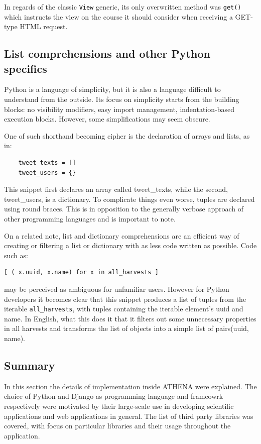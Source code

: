In regards of the classic \texttt{View} generic, its only overwritten method was \texttt{get()} which instructs the view on the course it should consider when receiving a GET-type HTML request.

\subsection{List comprehensions and other Python specifics}
\label{listcomprehensions}
Python is a language of simplicity, but it is also a language difficult to understand from the outside. Its focus on simplicity starts from the building blocks: no visibility modifiers, easy import management, indentation-based execution blocks. However, some simplifications may seem obscure.

One of such shorthand becoming cipher is the declaration of arrays and lists, as in:
\begin{lstlisting}
    tweet_texts = []
    tweet_users = {}
\end{lstlisting}

This snippet first declares an array called tweet\_texts, while the second, tweet\_users, is a dictionary. To complicate things even worse, tuples are declared using round braces. This is in opposition to the generally verbose approach of other programming languages and is important to note.

On a related note, list and dictionary comprehensions are an efficient way of creating or filtering a list or dictionary with as less code written as possible. Code such as:

\begin{lstlisting}
[ ( x.uuid, x.name) for x in all_harvests ]
\end{lstlisting}

may be perceived as ambiguous for unfamiliar users. However for Python developers it becomes clear that this snippet produces a list of tuples from the iterable \texttt{all\_harvests}, with tuples containing the iterable element's uuid and name. In English, what this does it that it filters out some unnecessary properties in all harvests and transforms the list of objects into a simple list of pairs(uuid, name).

\subsection*{Summary}
In this section the details of implementation inside ATHENA were explained. The choice of Python and Django as programming language and frameowrk respectively were motivated by their large-scale use in developing scientific applications and web applications in general. The list of third party libraries was covered, with focus on particular libraries and their usage throughout the application.

